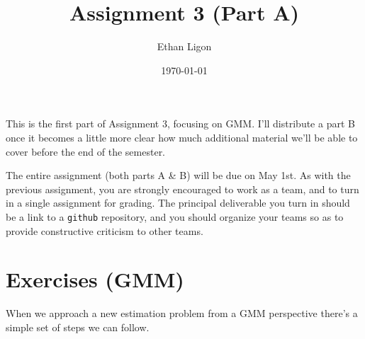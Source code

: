 \documentclass[12pt]{amsart}
\author{Ethan Ligon}
\date{\today}
\title{Assignment 3 (Part A)}
\begin{document}
\maketitle
This is the first part of Assignment 3, focusing on GMM.  I'll distribute a part B once it becomes a little more clear how much additional material we'll be able to cover before the end of the semester.

The entire assignment (both parts A \& B) will be due on May 1st.  As with the previous assignment, you are strongly encouraged to work as a  team, and to turn in a single assignment for grading.   The principal deliverable you turn in should be a link to a \texttt{github} repository, and you should organize your teams so as to provide constructive criticism to other teams.
\section{Exercises (GMM)}
\label{sec:orgb1fc826}
When we approach a new estimation problem from a GMM perspective
there's a simple set of steps we can follow.
\end{document}
